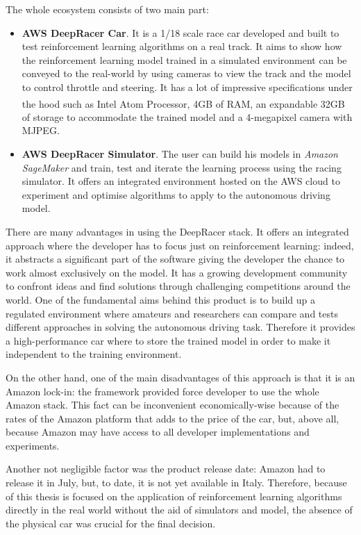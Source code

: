 The whole ecosystem consists of two main part:
\begin{itemize}
	\item \textbf{AWS DeepRacer Car}.
It is a 1/18 scale race car developed and built to test reinforcement learning algorithms on a real track.
It aims to show how the reinforcement learning model trained in a simulated environment can be conveyed to the real-world by using cameras to view the track and the model to control throttle and steering.
It has a lot of impressive specifications under the hood such as Intel Atom \textsuperscript{\textregistered} Processor, 4GB of RAM, an expandable 32GB of storage to accommodate the trained model and a 4-megapixel camera with MJPEG.
	\item \textbf{AWS DeepRacer Simulator}.
The user can build his models in \textit{Amazon SageMaker} and train, test and iterate the learning process using the racing simulator.
It offers an integrated environment hosted on the AWS cloud to experiment and optimise algorithms to apply to the autonomous driving model.
\end{itemize}

There are many advantages in using the DeepRacer stack.
It offers an integrated approach where the developer has to focus just on reinforcement learning: indeed, it abstracts a significant part of the software giving the developer the chance to work almost exclusively on the model.
It has a growing development community to confront ideas and find solutions through challenging competitions around the world.
One of the fundamental aims behind this product is to build up a regulated environment where amateurs and researchers can compare and tests different approaches in solving the autonomous driving task.
Therefore it provides a high-performance car where to store the trained model in order to make it independent to the training environment.


On the other hand, one of the main disadvantages of this approach is that it is an Amazon lock-in: the framework provided force developer to use the whole Amazon stack.
This fact can be inconvenient economically-wise because of the rates of the Amazon platform that adds to the price of the car, but, above all, because Amazon may have access to all developer implementations and experiments.

Another not negligible factor was the product release date: Amazon had to release it in July, but, to date, it is not yet available in Italy.
Therefore, because of this thesis is focused on the application of reinforcement learning algorithms directly in the real world without the aid of simulators and model, the absence of the physical car was crucial for the final decision.

